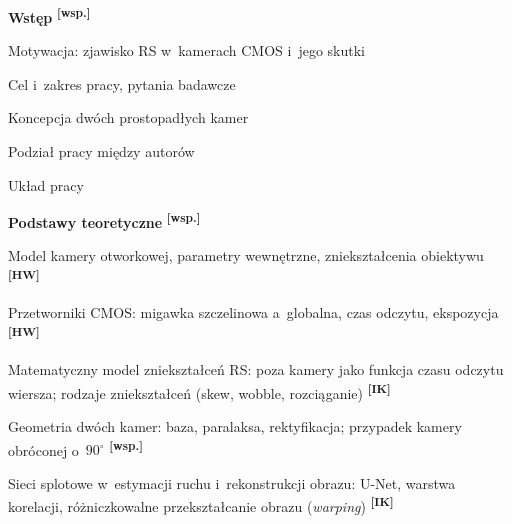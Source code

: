 \newcommand{\IK}{\textsuperscript{\textbf{[IK]}}}
\newcommand{\HW}{\textsuperscript{\textbf{[HW]}}}
\newcommand{\WS}{\textsuperscript{\textbf{[wsp.]}}}


\begin{toc}
\item \textbf{Wstęp} \WS
  \begin{toc}
    \item Motywacja: zjawisko RS w~kamerach CMOS i~jego skutki
    \item Cel i~zakres pracy, pytania badawcze
    \item Koncepcja dwóch prostopadłych kamer
    \item Podział pracy między autorów
    \item Układ pracy
  \end{toc}

\item \textbf{Podstawy teoretyczne} \WS
  \begin{toc}
    \item Model kamery otworkowej, parametry wewnętrzne, zniekształcenia obiektywu \HW
    \item Przetworniki CMOS: migawka szczelinowa a~globalna, czas odczytu, ekspozycja \HW
    \item Matematyczny model zniekształceń RS: poza kamery jako funkcja czasu odczytu wiersza;
          rodzaje zniekształceń (skew, wobble, rozciąganie) \IK
    \item Geometria dwóch kamer: baza, paralaksa, rektyfikacja; przypadek kamery obróconej o~$90^\circ$ \WS
    \item Sieci splotowe w~estymacji ruchu i~rekonstrukcji obrazu: U-Net, warstwa korelacji,
          różniczkowalne przekształcanie obrazu (\emph{warping}) \IK
  \end{toc}


\end{toc}
